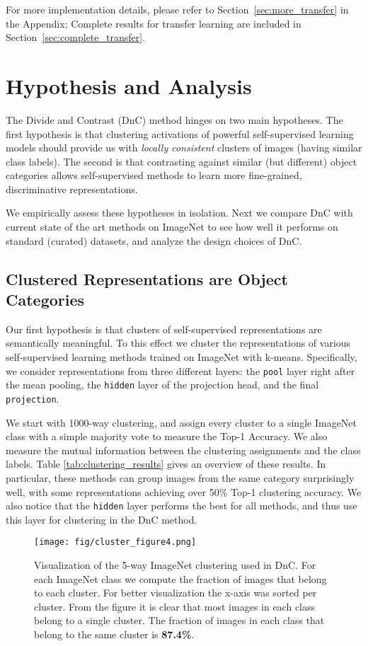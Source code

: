 \documentclass[final]{cvpr}
\begin{document}
For more implementation details, please refer to Section~\ref{sec:more_transfer} in the Appendix; Complete results for transfer learning are included in Section~\ref{sec:complete_transfer}. \section{Hypothesis and Analysis}

The Divide and Contrast (DnC) method hinges on two main hypotheses. The first hypothesis is that clustering activations of powerful self-supervised learning models should provide us with
\emph{locally consistent}
clusters of images (\eg having similar class labels). The second is that contrasting against similar (but different) object categories allows self-supervised methods to learn more fine-grained, discriminative representations. 

We empirically assess these hypotheses in isolation. Next we compare DnC with current state of the art methods on ImageNet to see how well it performs on standard (curated) datasets, and analyze the design choices of DnC.

\subsection{Clustered Representations are Object Categories}
Our first hypothesis is that clusters of self-supervised representations are semantically meaningful. To this effect we cluster the representations of various self-supervised learning methods trained on ImageNet with k-means. Specifically, we consider representations from three different layers: the \texttt{pool} layer right after the mean pooling, the \texttt{hidden} layer of the projection head, and the final \texttt{projection}.

We start with 1000-way clustering, and assign
every cluster to a single ImageNet class with a simple majority vote to measure the Top-1 Accuracy. We also measure the mutual information between the clustering assignments and the class labels. Table \ref{tab:clustering_results} gives an overview of these results.
In particular, these methods can group images from the same category surprisingly well, with some representations achieving over 50\% Top-1 clustering accuracy. We also notice that the \texttt{hidden} layer performs the best for all methods, and thus use this layer for clustering in the DnC method.

\begin{figure*}[t]
  \centering
  \texttt{[image: fig/cluster\_figure4.png]}
  \caption{Visualization of the 5-way ImageNet clustering used in DnC. For each ImageNet class we compute the fraction of images that belong to each cluster. For better visualization the x-axis was sorted per cluster. From the figure it is clear that most images in each class belong to a single cluster. The fraction of images in each class that belong to the same cluster is \textbf{87.4\%}.}
  \label{fig:cluster_figure}
\vspace{-5pt}
\end{figure*}
\end{document}
